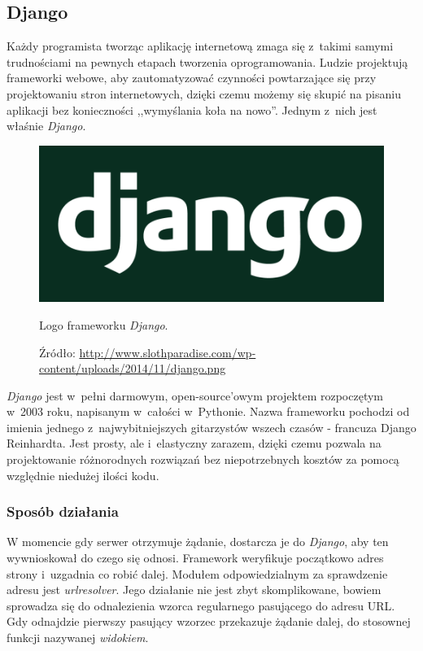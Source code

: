 \documentclass[a4paper,12pt,oneside]{mwrep}  %
\begin{document}
\subsection{Django}
Każdy programista tworząc aplikację internetową zmaga się z~takimi samymi trudnościami na pewnych etapach tworzenia oprogramowania. Ludzie projektują frameworki webowe, aby zautomatyzować czynności powtarzające się przy projektowaniu stron internetowych, dzięki czemu możemy się skupić na pisaniu aplikacji bez konieczności ,,wymyślania koła na nowo''. Jednym z~nich jest właśnie \emph{Django}. %
\begin{figure}[h]
\centering
\includegraphics[width=1\textwidth/3]{grafika/loga/django.png}
\caption{Logo frameworku \emph{Django}.}
\vspace{-0.8cm}
\caption*{\scriptsize Źródło: \url{http://www.slothparadise.com/wp-content/uploads/2014/11/django.png}}
\label{logo_django}
\end{figure}

\emph{Django} jest w~pełni darmowym, open-source'owym projektem rozpoczętym w~2003 roku, napisanym w~całości w~Pythonie. Nazwa frameworku pochodzi od imienia jednego z~najwybitniejszych gitarzystów wszech czasów - francuza Django Reinhardta. Jest prosty, ale i~elastyczny zarazem, dzięki czemu pozwala na projektowanie różnorodnych rozwiązań bez niepotrzebnych kosztów za pomocą względnie niedużej ilości kodu.

\subsubsection{Sposób działania}
W momencie gdy serwer otrzymuje żądanie, dostarcza je do \emph{Django}, aby ten wywnioskował do czego się odnosi. Framework weryfikuje początkowo adres strony i~uzgadnia co robić dalej. Modułem odpowiedzialnym za sprawdzenie adresu jest \emph{urlresolver}. Jego działanie nie jest zbyt skomplikowane, bowiem sprowadza się do odnalezienia wzorca regularnego pasującego do adresu URL. Gdy odnajdzie pierwszy pasujący wzorzec przekazuje żądanie dalej, do stosownej funkcji nazywanej \emph{widokiem}. %
\end{document}
